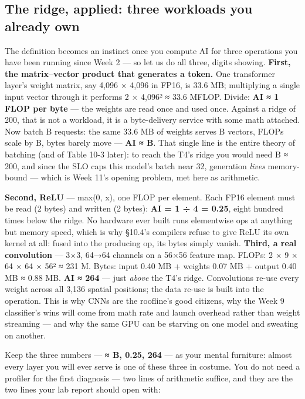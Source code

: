 \subsection*{The ridge, applied: three workloads you already own}

The definition becomes an instinct once you compute AI for three operations you have been running since Week 2 — so let us do all three, digits showing. \textbf{First, the matrix–vector product that generates a token.} One transformer layer's weight matrix, say 4,096 × 4,096 in FP16, is 33.6 MB; multiplying a single input vector through it performs 2 × 4,096² ≈ 33.6 MFLOP. Divide: \textbf{AI ≈ 1 FLOP per byte} — the weights are read once and used once. Against a ridge of 200, that is not a workload, it is a byte-delivery service with some math attached. Now batch B requests: the same 33.6 MB of weights serves B vectors, FLOPs scale by B, bytes barely move — \textbf{AI ≈ B}. That single line is the entire theory of batching (and of Table 10-3 later): to reach the T4's ridge you would need B ≈ 200, and since the SLO caps this model's batch near 32, generation \textit{lives} memory-bound — which is Week 11's opening problem, met here as arithmetic.

\textbf{Second, ReLU} — max(0, x), one FLOP per element. Each FP16 element must be read (2 bytes) and written (2 bytes): \textbf{AI = 1 ÷ 4 = 0.25}, eight hundred times below the ridge. No hardware ever built runs elementwise ops at anything but memory speed, which is why §10.4's compilers refuse to give ReLU its own kernel at all: fused into the producing op, its bytes simply vanish. \textbf{Third, a real convolution} — 3×3, 64→64 channels on a 56×56 feature map. FLOPs: 2 × 9 × 64 × 64 × 56² ≈ 231 M. Bytes: input 0.40 MB + weights 0.07 MB + output 0.40 MB ≈ 0.88 MB. \textbf{AI ≈ 264} — just \textit{above} the T4's ridge. Convolutions re-use every weight across all 3,136 spatial positions; the data re-use is built into the operation. This is why CNNs are the roofline's good citizens, why the Week 9 classifier's wins will come from math rate and launch overhead rather than weight streaming — and why the same GPU can be starving on one model and sweating on another.

Keep the three numbers — \textbf{≈ B, 0.25, 264} — as your mental furniture: almost every layer you will ever serve is one of these three in costume. You do not need a profiler for the first diagnosis — two lines of arithmetic suffice, and they are the two lines your lab report should open with:


